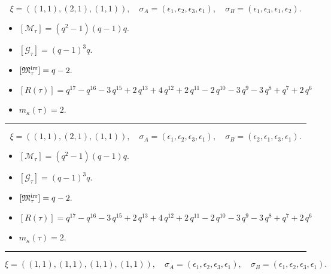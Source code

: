 \documentclass[10pt,a4paper]{amsart}
\begin{document}
$$\xi = ({(1, 1)}, {(2, 1)}, {(1, 1)}),\quad \sigma_A = ({{\epsilon_1}}, {{\epsilon_2, \epsilon_3}}, {{\epsilon_1}}),\quad \sigma_B = ({{\epsilon_1}}, {{\epsilon_3, \epsilon_1}}, {{\epsilon_2}}).$$

\begin{itemize}
 \item $[\mathcal{M}_{\tau}] = {\left(q^{2} - 1\right)} {\left(q - 1\right)} q .$

 \item $[\mathcal{G}_{\tau}] = {\left(q - 1\right)}^{3} q .$

 \item $[{\frak M}_{\tau}^{\textrm{irr}}] = q - 2 .$

 \item $[R(\tau)] = q^{17} - q^{16} - 3 \, q^{15} + 2 \, q^{13} + 4 \, q^{12} + 2 \, q^{11} - 2 \, q^{10} - 3 \, q^{9} - 3 \, q^{8} + q^{7} + 2 \, q^{6} $

 \item $m_{\kappa}(\tau) = 2 .$

 \end{itemize}
\noindent\rule{8cm}{0.4pt}

$$\xi = ({(1, 1)}, {(2, 1)}, {(1, 1)}),\quad \sigma_A = ({{\epsilon_1}}, {{\epsilon_2, \epsilon_3}}, {{\epsilon_1}}),\quad \sigma_B = ({{\epsilon_2}}, {{\epsilon_1, \epsilon_3}}, {{\epsilon_1}}).$$

\begin{itemize}
 \item $[\mathcal{M}_{\tau}] = {\left(q^{2} - 1\right)} {\left(q - 1\right)} q .$

 \item $[\mathcal{G}_{\tau}] = {\left(q - 1\right)}^{3} q .$

 \item $[{\frak M}_{\tau}^{\textrm{irr}}] = q - 2 .$

 \item $[R(\tau)] = q^{17} - q^{16} - 3 \, q^{15} + 2 \, q^{13} + 4 \, q^{12} + 2 \, q^{11} - 2 \, q^{10} - 3 \, q^{9} - 3 \, q^{8} + q^{7} + 2 \, q^{6} $

 \item $m_{\kappa}(\tau) = 2 .$

 \end{itemize}
\noindent\rule{8cm}{0.4pt}

$$\xi = ({(1, 1)}, {(1, 1), (1, 1)}, {(1, 1)}),\quad \sigma_A = ({{\epsilon_1}}, {{\epsilon_2}, {\epsilon_3}}, {{\epsilon_1}}),\quad \sigma_B = ({{\epsilon_1}}, {{\epsilon_2}, {\epsilon_3}}, {{\epsilon_1}}).$$
\end{document}
